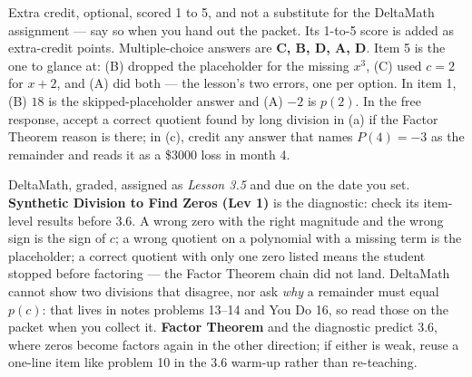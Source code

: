 \documentclass[10pt]{article}
\begin{document}
\begin{teachernote}[AP Practice]
Extra credit, optional, scored 1 to 5, and not a substitute for the DeltaMath assignment --- say
so when you hand out the packet. Its 1-to-5 score is added as extra-credit points.
Multiple-choice answers are \textbf{C, B, D, A, D}. Item 5 is the one to glance at: (B) dropped
the placeholder for the missing $x^3$, (C) used $c = 2$ for $x + 2$, and (A) did both --- the
lesson's two errors, one per option. In item 1, (B) $18$ is the skipped-placeholder answer and
(A) $-2$ is $p(2)$. In the free response, accept a correct quotient found by long division in
(a) if the Factor Theorem reason is there; in (c), credit any answer that names $P(4) = -3$ as
the remainder and reads it as a \$3000 loss in month 4.
\end{teachernote}

\begin{teachernote}[Homework]
DeltaMath, graded, assigned as \textit{Lesson 3.5} and due on the date you set.
\textbf{Synthetic Division to Find Zeros (Lev 1)} is the diagnostic: check its item-level
results before 3.6. A wrong zero with the right magnitude and the wrong sign is the sign of $c$;
a wrong quotient on a polynomial with a missing term is the placeholder; a correct quotient
with only one zero listed means the student stopped before factoring --- the Factor Theorem
chain did not land. DeltaMath cannot show two divisions that disagree, nor ask \emph{why} a
remainder must equal $p(c)$: that lives in notes problems 13--14 and You Do 16, so read those
on the packet when you collect it. \textbf{Factor Theorem} and the diagnostic predict 3.6, where
zeros become factors again in the other direction; if either is weak, reuse a one-line item like
problem 10 in the 3.6 warm-up rather than re-teaching.
\end{teachernote}
\end{document}
